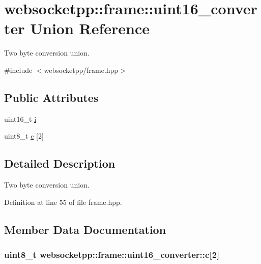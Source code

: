 \hypertarget{unionwebsocketpp_1_1frame_1_1uint16__converter}{}\section{websocketpp\+:\+:frame\+:\+:uint16\+\_\+converter Union Reference}
\label{unionwebsocketpp_1_1frame_1_1uint16__converter}


Two byte conversion union.  




{\ttfamily \#include $<$websocketpp/frame.\+hpp$>$}

\subsection*{Public Attributes}
\begin{DoxyCompactItemize}
\item 
uint16\+\_\+t \hyperlink{unionwebsocketpp_1_1frame_1_1uint16__converter_af60efc5747260bafeb6cd2b8ab267e2d}{i}
\item 
uint8\+\_\+t \hyperlink{unionwebsocketpp_1_1frame_1_1uint16__converter_acac6733730c538163e39f4fed359168a}{c} \mbox{[}2\mbox{]}
\end{DoxyCompactItemize}


\subsection{Detailed Description}
Two byte conversion union. 

Definition at line 55 of file frame.\+hpp.



\subsection{Member Data Documentation}
\hypertarget{unionwebsocketpp_1_1frame_1_1uint16__converter_acac6733730c538163e39f4fed359168a}{}
\subsubsection[{c}]{\setlength{\rightskip}{0pt plus 5cm}uint8\+\_\+t websocketpp\+::frame\+::uint16\+\_\+converter\+::c\mbox{[}2\mbox{]}}\label{unionwebsocketpp_1_1frame_1_1uint16__converter_acac6733730c538163e39f4fed359168a}


